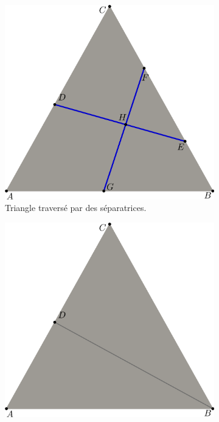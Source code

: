 \begin{figure}[h!]
\centering
\begin{subfigure}{0.45\textwidth}
    \includegraphics[width=\textwidth]{images/decoup_triangle.pdf}
    \caption{Triangle traversé par des séparatrices.}
    \label{fig:exemple_insert_pt_0}
\end{subfigure}
\hfill
\begin{subfigure}{0.45\textwidth}
    \includegraphics[width=\textwidth]{images/decoup_triangle-1.pdf}

\end{subfigure}
\end{figure}
